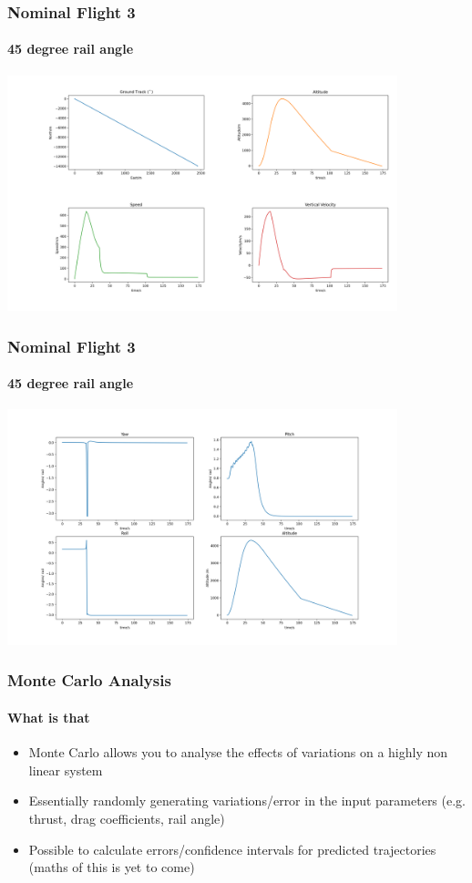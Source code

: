 \documentclass{beamer}
\begin{document}
    \begin{frame}
        \frametitle{Nominal Flight 3}
        \framesubtitle{45 degree rail angle}
        \includegraphics[width=0.85\textwidth]{images/example3a.png}
    \end{frame}
    \begin{frame}
        \frametitle{Nominal Flight 3}
        \framesubtitle{45 degree rail angle}
        \includegraphics[width=0.85\textwidth]{images/example3b.png}
    \end{frame}
    \begin{frame}
        \frametitle{Monte Carlo Analysis}
        \framesubtitle{What is that}
        \begin{itemize}
            \item Monte Carlo allows you to analyse the effects of variations on a highly non linear system
            \item Essentially randomly generating variations/error in the input parameters (e.g. thrust, drag coefficients, rail angle)
            \item Possible to calculate errors/confidence intervals for predicted trajectories (maths of this is yet to come)
        \end{itemize} 
    \end{frame}
\end{document}
